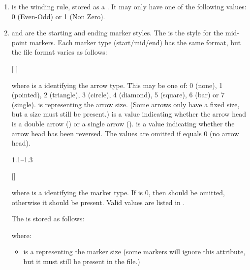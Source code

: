 \begin{numbered}
\begin{enumerate}
\begin{enumerate}
    \item {} is the winding rule, stored as a .
    It may only have one of the following values: 0 (Even-Odd) or
    1 (Non Zero).

    \item {} and  are the starting and
    ending marker styles. The  is the style for the
    mid-point markers.  Each marker type (start/mid/end) has the same
    format, but the file format varies as follows:
    \begin{jdrversion}{1.0}
    \begin{syntaxline}
     [  ]
    \end{syntaxline}
    where  is a  identifying the arrow type. This may
    be one of: 0 (none), 1 (pointed), 2 (triangle), 3 (circle),
    4 (diamond), 5 (square), 6 (bar) or 7 (single).  is
     representing the arrow size.
    (Some arrows only have a fixed size, but a size must still be
    present.)  is a  value indicating whether the
    arrow head is a double arrow () or a single arrow
    ().  is a  value indicating
    whether the arrow head has been reversed. The values
     are omitted if
     equals 0 (no arrow head).
    \end{jdrversion}
    \begin{jdrversion}{1.1--1.3}
    \begin{syntaxline}
     []
    \end{syntaxline}
    \end{jdrversion}
    where  is a  identifying the marker type.
    If  is 0, then  should be omitted,
    otherwise it should be present. Valid  values are listed
    in .

    The  is stored as follows:
    \begin{syntaxline}
       
  
    \end{syntaxline}
    where:
      \begin{itemize}
      \item {} is a  representing the marker size
      (some markers will ignore this attribute, but it must still be
      present in the file.)


\end{itemize}
\end{enumerate}
\end{enumerate}
\end{numbered}
